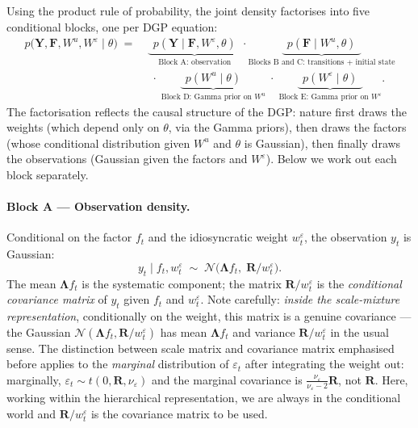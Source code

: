\documentclass[11pt, a4paper, oneside]{article}
\newcommand{\mY}{\mathbf{Y}}
\newcommand{\mF}{\mathbf{F}}
\newcommand{\mL}{\boldsymbol{\Lambda}}
\newcommand{\mR}{\mathbf{R}}
\begin{document}
Using the product rule of probability, the joint density factorises
into five conditional blocks, one per DGP equation:
\begin{align*}
p\big(\mY, \mF, W^u, W^\varepsilon \mid \theta\big)
\;=\;
&\underbrace{\phantom{\big|}\, p(\mY \mid \mF, W^\varepsilon, \theta)\,\phantom{\big|}}_{\text{Block A: observation}}
\cdot
\underbrace{\phantom{\big|}\, p(\mF \mid W^u, \theta)\,\phantom{\big|}}_{\text{Blocks B and C: transitions + initial state}} \\[6pt]
&\;\cdot\;
\underbrace{\phantom{\big|}\, p(W^u \mid \theta)\,\phantom{\big|}}_{\text{Block D: Gamma prior on $W^u$}}
\;\cdot\;
\underbrace{\phantom{\big|}\, p(W^\varepsilon \mid \theta)\,\phantom{\big|}}_{\text{Block E: Gamma prior on $W^\varepsilon$}}.
\end{align*}
The factorisation reflects the causal structure of the DGP: nature
first draws the weights (which depend only on $\theta$, via the Gamma
priors), then draws the factors (whose conditional distribution given
$W^u$ and $\theta$ is Gaussian), then finally draws the observations
(Gaussian given the factors and $W^\varepsilon$). Below we work out each
block separately.

\paragraph{Block A — Observation density.}
Conditional on the factor $f_t$ and the idiosyncratic weight
$w^\varepsilon_t$, the observation $y_t$ is Gaussian:
\[
y_t \mid f_t, w^\varepsilon_t \;\sim\; \mathcal{N}\!\big(\mL f_t,\; \mR / w^\varepsilon_t\big).
\]
The mean $\mL f_t$ is the systematic component; the matrix
$\mR / w^\varepsilon_t$ is the \emph{conditional covariance matrix} of
$y_t$ given $f_t$ and $w^\varepsilon_t$. Note carefully: \emph{inside
the scale-mixture representation}, conditionally on the weight, this
matrix is a genuine covariance — the Gaussian $\mathcal{N}(\mL f_t, \mR/w^\varepsilon_t)$
has mean $\mL f_t$ and variance $\mR/w^\varepsilon_t$ in the usual
sense. The distinction between scale matrix and covariance matrix
emphasised before applies to the \emph{marginal}
distribution of $\varepsilon_t$ after integrating the weight out:
marginally, $\varepsilon_t \sim t(0, \mR, \nu_\varepsilon)$ and the
marginal covariance is $\tfrac{\nu_\varepsilon}{\nu_\varepsilon - 2}\mR$,
not $\mR$. Here, working within the hierarchical representation, we are
always in the conditional world and $\mR / w^\varepsilon_t$ is the
covariance matrix to be used.
\end{document}
